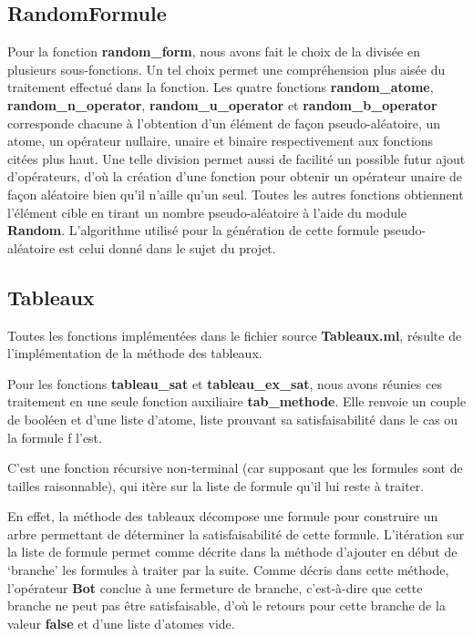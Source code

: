 \documentclass[12pt]{article}
\begin{document}
    \subsection{RandomFormule}\label{random-form}

    Pour la fonction \textbf{random\_form}, nous avons fait le choix de la divisée en 
    plusieurs sous-fonctions. Un tel choix permet une compréhension plus
    aisée du traitement effectué dans la fonction. Les quatre fonctions 
    \textbf{random\_atome}, \textbf{random\_n\_operator}, 
    \textbf{random\_u\_operator} et \textbf{random\_b\_operator} corresponde 
    chacune à l'obtention d'un élément de façon pseudo-aléatoire, un atome, un 
    opérateur nullaire, unaire et binaire respectivement aux fonctions citées plus 
    haut. Une telle division permet aussi de facilité un possible futur ajout 
    d'opérateurs, d'où la création d'une fonction pour obtenir un opérateur 
    unaire de façon aléatoire bien qu'il n'aille qu'un seul. Toutes les autres 
    fonctions obtiennent l'élément cible en tirant un nombre pseudo-aléatoire à 
    l'aide du module \textbf{Random}. L'algorithme utilisé pour la génération de 
    cette formule pseudo-aléatoire est celui donné dans le sujet du projet.

    \subsection{Tableaux}

    Toutes les fonctions implémentées dans le fichier source \textbf{Tableaux.ml}, 
    résulte de l'implémentation de la méthode des tableaux.   

    \vphantom{}

    Pour les fonctions \textbf{tableau\_sat} et \textbf{tableau\_ex\_sat}, nous 
    avons réunies ces traitement en une seule fonction auxiliaire \textbf{tab\_methode}.
    Elle renvoie un couple de booléen et d'une liste d'atome, liste prouvant sa 
    satisfaisabilité dans le cas ou la formule f l'est. 

    C'est une fonction récursive non-terminal (car supposant que les formules sont 
    de tailles raisonnable), qui itère sur la liste de formule qu'il lui reste à 
    traiter.

    En effet, la méthode des tableaux décompose une formule pour construire un 
    arbre permettant de déterminer la satisfaisabilité de cette formule. L'itération 
    sur la liste de formule permet comme décrite dans la méthode d'ajouter en début 
    de `branche' les formules à traiter par la suite. 
    Comme décris dans cette méthode, l'opérateur \textbf{Bot} conclue à une 
    fermeture de branche, c'est-à-dire que cette branche ne peut pas être 
    satisfaisable, d'où le retours pour cette branche de la valeur 
    \textbf{false} et d'une liste d'atomes vide. 
\end{document}
